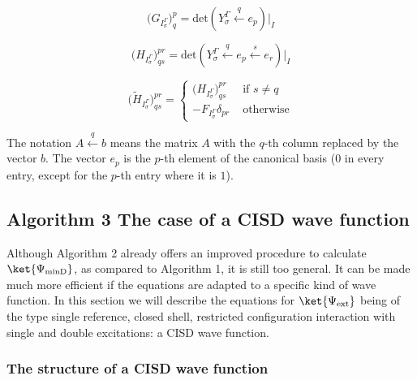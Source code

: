 \documentclass[a4paper,11pt]{article}
\newcommand{\irp}{\ensuremath{\Gamma}}
\begin{document}
\begin{equation}
  \big( G_{I_\sigma^\irp} \big)^p_q = \text{det} \left( Y_\sigma^\irp \overset{q}{\leftarrow} e_p \right) \big|_I
\end{equation}

\begin{equation}
  \big( H_{I_\sigma^\irp} \big)^{pr}_{qs} =
  \text{det} \left( Y_\sigma^\irp \overset{q}{\leftarrow} e_p
    \overset{s}{\leftarrow} e_r \right) \big|_I
\end{equation}

\begin{equation}
  \big( \tilde{H}_{I_\sigma^\irp} \big)^{pr}_{qs} =
  \left\{
    \begin{array}{ll}
      \big( H_{I_\sigma^\irp} \big)^{pr}_{qs} & \text{ if } s \ne q\\
      -F_{I_\sigma^\irp} \delta_{pr} & \text{ otherwise}
    \end{array}
  \right.
\end{equation}

The notation $A \overset{q}{\leftarrow}b$ means the matrix $A$ with the $q$-th column replaced by the vector $b$.
The vector $e_p$ is the $p$-th element of the canonical basis ($0$ in every entry, except for the $p
$-th entry where it is $1$).


\subsection{\textsf{\LARGE Algorithm 3} The case of a CISD wave function}

Although Algorithm 2 already offers an improved procedure to calculate $\ket{\Psi_\text{minD}}$, as compared to Algorithm 1, it is still too general.
It can be made much more efficient if the equations are adapted to a specific kind of wave function.
In this section we will describe the equations for $\ket{\Psi_\text{ext}}$ being of the type single reference, closed shell, restricted configuration interaction with single and double excitations: a CISD wave function.

\subsubsection{The structure of a CISD wave function}
\label{sec:struct_cisd_wf}
\end{document}
